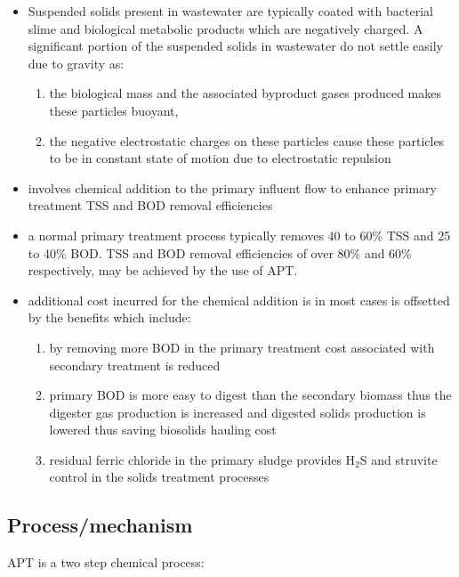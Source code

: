         \begin{itemize}
			\item Suspended solids present in wastewater are typically coated with bacterial slime and biological metabolic products which are negatively charged.  A significant portion of the suspended solids in wastewater do not settle easily due to gravity as:
				\begin{enumerate}
					\item the biological mass and the associated byproduct gases produced makes these particles buoyant, 
					\item the negative electrostatic charges on these particles cause these particles to be in constant state of motion due to electrostatic repulsion
				\end{enumerate}
			\item involves chemical addition to the primary influent flow to enhance primary treatment TSS and BOD removal efficiencies
			\item a normal primary treatment process typically removes 40 to 60\% TSS and 25 to 40\% BOD.  TSS and BOD removal efficiencies of over 80\% and 60\% respectively, may be achieved by the use of APT.
			\item additional cost incurred for the chemical addition is in most cases is offsetted by the benefits which include:
				\begin{enumerate}
					\item by removing more BOD in the primary treatment cost associated with secondary treatment is reduced
					\item primary BOD is more easy to digest than the secondary biomass thus the digester gas production is increased and digested solids production is lowered thus saving biosolids hauling cost
					\item residual ferric chloride in the primary sludge provides H$_2$S and struvite control in the solids treatment processes  
				\end{enumerate}
		\end{itemize}
\vspace{0.4 cm}

\subsection{Process/mechanism}    

APT is a two step chemical process:

